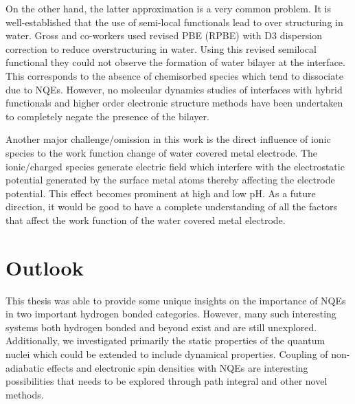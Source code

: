 \noindent On the other hand, the latter approximation is a very common problem. It is well-established that the use of semi-local functionals lead to over structuring in water\cite{gross2022ab}. Gross and co-workers\cite{forster2014dispersion} used revised PBE (RPBE\cite{hammer1999improved}) with D3 dispersion correction to reduce overstructuring in water. Using this revised semilocal functional they could not observe the formation of water bilayer at the interface. This corresponds to the absence of chemisorbed species which tend to dissociate due to NQEs. However, no molecular dynamics studies of interfaces with hybrid functionals and higher order electronic structure methods have been undertaken to completely negate the presence of the bilayer. 

\noindent Another major challenge/omission in this work is the direct influence of ionic species to the work function change of water covered metal electrode. The ionic/charged species generate electric field which interfere with the electrostatic potential generated by the surface metal atoms thereby affecting the electrode potential. This effect becomes prominent at high and low pH. As a future direction, it would be good to have a complete understanding of all the factors that affect the work function of the water covered metal electrode.

\section{Outlook}
\noindent This thesis was able to provide some unique insights on the importance of  NQEs in two important hydrogen bonded categories. However, many such interesting systems both hydrogen bonded and beyond exist and are still unexplored. Additionally, we investigated primarily the static properties of the quantum nuclei which could be extended to include dynamical properties. Coupling of non-adiabatic effects and electronic spin densities with NQEs are interesting possibilities that needs to be explored through path integral and other novel methods. 


